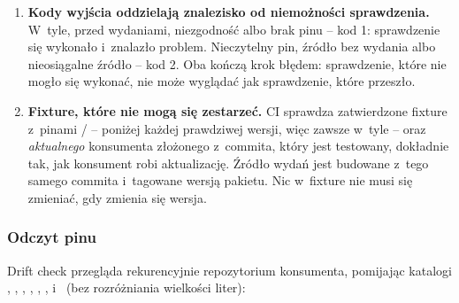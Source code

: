 \begin{enumerate}
         narzędzia. Composite action
        () instaluje .NET~10 SDK tylko wtedy, gdy runner
        go nie ma, i~uruchamia polecenie z~własnego checkoutu (więc SDK wybiera
         tego repozytorium, a~nie konsumenta). Wejścia docierają do
        skryptu przez zmienne środowiskowe, nigdy przez interpolację wyrażeń w~treść skryptu.
        W~GitHub Actions wynik jest też adnotacją błędu, podsumowaniem kroku i~wyjściami kroku
        (, , ).
  \item \textbf{Kody wyjścia oddzielają znalezisko od niemożności sprawdzenia.} W~tyle,
        przed wydaniami, niezgodność albo brak pinu -- kod 1: sprawdzenie się wykonało
        i~znalazło problem. Nieczytelny pin, źródło bez wydania albo nieosiągalne źródło --
        kod 2. Oba kończą krok błędem: sprawdzenie, które nie mogło się wykonać, nie może
        wyglądać jak sprawdzenie, które przeszło.
  \item \textbf{Fixture, które nie mogą się zestarzeć.} CI sprawdza zatwierdzone fixture
        z~pinami / -- poniżej każdej prawdziwej wersji, więc
        zawsze w~tyle -- oraz \emph{aktualnego} konsumenta złożonego z~commita, który jest
        testowany, dokładnie tak, jak konsument robi aktualizację. Źródło wydań jest budowane
        z~tego samego commita i~tagowane wersją pakietu. Nic w~fixture nie musi się zmieniać,
        gdy zmienia się wersja.
\end{enumerate}

\subsubsection{Odczyt pinu}

Drift check przegląda rekurencyjnie repozytorium konsumenta, pomijając katalogi
, , , , , ,
 i~ (bez rozróżniania wielkości liter):

